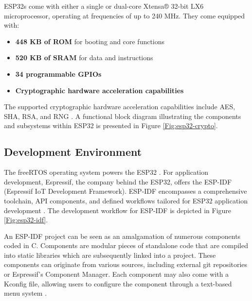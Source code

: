 ESP32s come with either a single or dual-core Xtensa® 32-bit LX6 microprocessor, operating at frequencies of up to 240 MHz. They come equipped with:
\begin{itemize}
    \item \textbf{448 KB of ROM} for booting and core functions \cite[4-5]{esp32-series}
    \item \textbf{520 KB of SRAM} for data and instructions \cite[4-5]{esp32-series}
    \item \textbf{34 programmable GPIOs} \cite[4-5]{esp32-series}
    \item \textbf{Cryptographic hardware acceleration capabilities} \cite[4-5]{esp32-series}
\end{itemize}

The supported cryptographic hardware acceleration capabilities include \ac{AES}, \ac{SHA}, \ac{RSA}, and \ac{RNG} \cite[4-5]{esp32-series}. A functional block diagram illustrating the components and subsystems within ESP32 is presented in Figure \ref{Fig:esp32-crypto}.

\subsection{Development Environment}
The freeRTOS operating system powers the ESP32 \cite[6]{esp32-module}. For application development, Espressif, the company behind the ESP32, offers the ESP-IDF (Espressif IoT Development Framework). ESP-IDF encompasses a comprehensive toolchain, API components, and defined workflows tailored for ESP32 application development \cite{esp32-prog}. The development workflow for ESP-IDF is depicted in Figure \ref{Fig:esp32-idf}.

An ESP-IDF project can be seen as an amalgamation of numerous components coded in C. Components are modular pieces of standalone code that are compiled into static libraries which are subsequently linked into a project. These components can originate from various sources, including external git repositories or Espressif's Component Manager. Each component may also come with a Kconfig file, allowing users to configure the component through a text-based menu system \cite{esp-prog}.    
